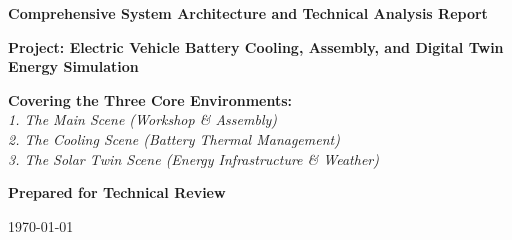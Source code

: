 \documentclass[12pt,a4paper,oneside]{report}
\begin{document}
\begin{titlepage}
    \begin{center}
        \vspace*{2cm}
        
        \Huge
        \textbf{Comprehensive System Architecture and Technical Analysis Report}
        
        \vspace{1.5cm}
        
        \LARGE
        \textbf{Project: Electric Vehicle Battery Cooling, Assembly, and Digital Twin Energy Simulation}
        
        \vspace{2cm}
        
        \Large
        \textbf{Covering the Three Core Environments:} \\
        \vspace{0.5cm}
        \textit{1. The Main Scene (Workshop \& Assembly)} \\
        \textit{2. The Cooling Scene (Battery Thermal Management)} \\
        \textit{3. The Solar Twin Scene (Energy Infrastructure \& Weather)}
        
        \vspace{3cm}
        
        \vfill
        
        \large
        \textbf{Prepared for Technical Review}
        
        \vspace{1cm}
        
        \normalsize
        \today
        
    \end{center}
\end{titlepage}
\end{document}
